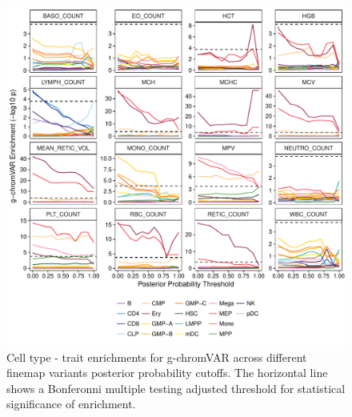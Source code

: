 \documentclass{article}\usepackage[]{graphicx}\usepackage[]{color}
\makeatletter
\def\maxwidth{ %
  \ifdim\Gin@nat@width>\linewidth
    \linewidth
  \else
    \Gin@nat@width
  \fi
}
\newenvironment{knitrout}{}{} %
\makeatother
\begin{document}
\begin{knitrout}
\color{fgcolor}\begin{figure}[H]

{\centering \includegraphics[width=\maxwidth]{figure/varyingPP-1} 

}

\caption[Cell type - trait enrichments for g-chromVAR across different finemap variants posterior probability cutoffs]{Cell type - trait enrichments for g-chromVAR across different finemap variants posterior probability cutoffs. The horizontal line shows a Bonferonni multiple testing adjusted threshold for statistical significance of enrichment.}\label{fig:varyingPP}
\end{figure}


\end{knitrout}
\end{document}
